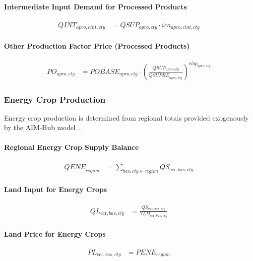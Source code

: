 \paragraph{Intermediate Input Demand for Processed Products}
\begin{align}
  QINT_{apro,cint,cty}
  &= QSUP_{apro,cty}
     \cdot
     ica_{apro,cint,cty}
  \tag{QINTINPUTEQ}\label{eq:QINTINPUTEQ}
\end{align}

\paragraph{Other Production Factor Price (Processed Products)}
\begin{align}
  PO_{apro,cty}
  &= \overline{POBASE}_{apro,cty}
     \cdot
     \left(
       \frac{
         QSUP_{apro,cty}
       }{
         \overline{QSUPRE}_{apro,cty}
       }
     \right)^{elop_{apro,cty}}
  \tag{POPROEQ}\label{eq:POPROEQ}
\end{align}

\subsubsection{Energy Crop Production}
Energy crop production is determined from regional totals provided exogenously by the AIM-Hub model~\cite{fujimoriSSP3AIMImplementation2017}.


\paragraph{Regional Energy Crop Supply Balance}
\begin{align}
  \overline{QENE}_{region}
  &= \sum_{bas,cty \in region}
     QS_{\mathrm{ecr},bas,cty}
  \tag{QSENEEQ}\label{eq:QSENEEQ}
\end{align}

\paragraph{Land Input for Energy Crops}
\begin{align}
  QL_{\mathrm{ecr},bas,cty}
  &= \frac{
       QS_{\mathrm{ecr},bas,cty}
     }{
       YLD_{\mathrm{ecr},bas,cty}
     }
  \tag{QLENEINPUTEQ}\label{eq:QLENEINPUTEQ}
\end{align}

\paragraph{Land Price for Energy Crops}
\begin{align}
  PL_{\mathrm{ecr},bas,cty}
  &= PENE_{region}
  \tag{PLENEEQ}\label{eq:PLENEEQ}
\end{align}


